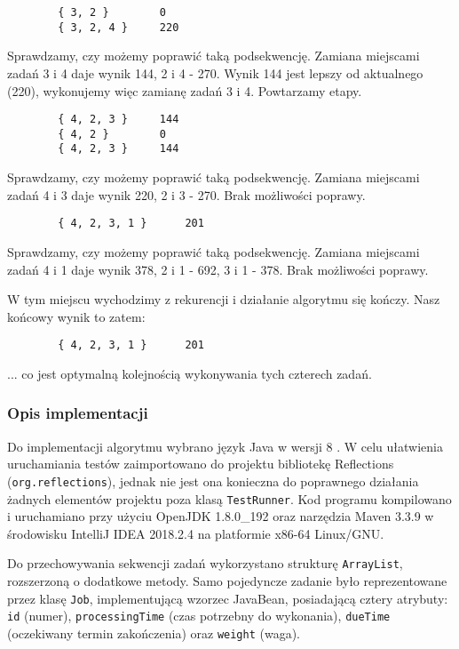 \documentclass[polish,polish,a4paper]{article}
\begin{document}
	\begin{lstlisting}
		{ 3, 2 }		0
		{ 3, 2, 4 }		220
	\end{lstlisting}
	
	Sprawdzamy, czy możemy poprawić taką podsekwencję. Zamiana miejscami zadań 3 i 4 daje wynik 144, 2 i 4 - 270. Wynik 144 jest lepszy od aktualnego (220), wykonujemy więc zamianę zadań 3 i 4. Powtarzamy etapy.
	
	\begin{lstlisting}
		{ 4, 2, 3 }		144
		{ 4, 2 }		0
		{ 4, 2, 3 }		144
	\end{lstlisting}
	
	Sprawdzamy, czy możemy poprawić taką podsekwencję. Zamiana miejscami zadań 4 i 3 daje wynik 220, 2 i 3 - 270. Brak możliwości poprawy.
	
	\begin{lstlisting}
		{ 4, 2, 3, 1 }		201
	\end{lstlisting}
	
	Sprawdzamy, czy możemy poprawić taką podsekwencję. Zamiana miejscami zadań 4 i 1 daje wynik 378, 2 i 1 - 692, 3 i 1 - 378. Brak możliwości poprawy.
	
	W tym miejscu wychodzimy z rekurencji i działanie algorytmu się kończy. Nasz końcowy wynik to zatem:
	
	\begin{lstlisting}
		{ 4, 2, 3, 1 }		201
	\end{lstlisting}
	
	... co jest optymalną kolejnością wykonywania tych czterech zadań.
	
	\lstset{style=defaultStyle}
	\subsubsection{Opis implementacji}
	
	Do implementacji algorytmu wybrano język Java w wersji 8 \cite{JavaDocs}. W celu ułatwienia uruchamiania testów zaimportowano do projektu bibliotekę Reflections (\texttt{org.reflections}), jednak nie jest ona konieczna do poprawnego działania żadnych elementów projektu poza klasą \texttt{TestRunner}. Kod programu kompilowano i uruchamiano przy użyciu OpenJDK 1.8.0\_192 oraz narzędzia Maven 3.3.9 w środowisku IntelliJ IDEA 2018.2.4 na platformie x86-64 Linux/GNU.
	
	Do przechowywania sekwencji zadań wykorzystano strukturę \texttt{ArrayList}, rozszerzoną o dodatkowe metody. Samo pojedyncze zadanie było reprezentowane przez klasę \texttt{Job}, implementującą wzorzec JavaBean, posiadającą cztery atrybuty: \texttt{id} (numer), \texttt{processingTime} (czas potrzebny do wykonania), \texttt{dueTime} (oczekiwany termin zakończenia) oraz \texttt{weight} (waga).
	
\end{document}
